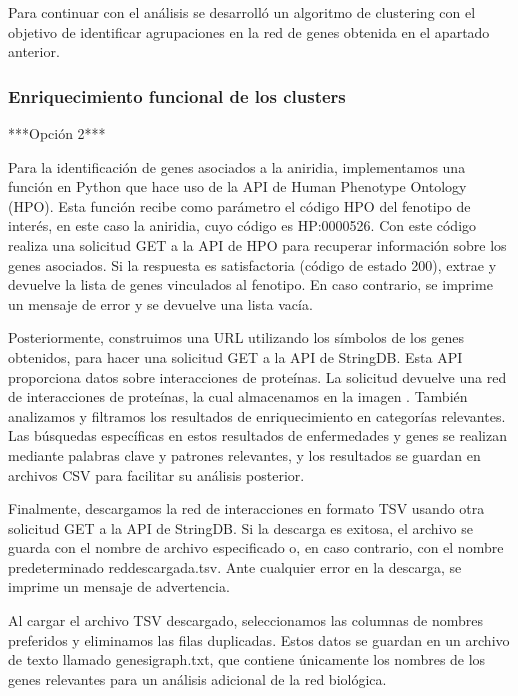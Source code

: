 Para continuar con el análisis se desarrolló un algoritmo de clustering con el objetivo de identificar agrupaciones en la red de genes obtenida en el apartado anterior.


\subsubsection{Enriquecimiento funcional de los clusters}





\newpage
\newpage


***Opción 2***

Para la identificación de genes asociados a la aniridia, implementamos una función en Python que hace uso de la API de Human Phenotype Ontology (HPO). Esta función recibe como parámetro el código HPO del fenotipo de interés, en este caso la aniridia, cuyo código es HP:0000526. Con este código realiza una solicitud GET a la API de HPO para recuperar información sobre los genes asociados. Si la respuesta es satisfactoria (código de estado 200), extrae y devuelve la lista de genes vinculados al fenotipo. En caso contrario, se imprime un mensaje de error y se devuelve una lista vacía.

Posteriormente, construimos una URL utilizando los símbolos de los genes obtenidos, para hacer una solicitud GET a la API de StringDB. Esta API proporciona datos sobre interacciones de proteínas. La solicitud devuelve una red de interacciones de proteínas, la cual almacenamos en la imagen .
También analizamos y filtramos los resultados de enriquecimiento en categorías relevantes. Las búsquedas específicas en estos resultados de enfermedades y genes se realizan mediante palabras clave y patrones relevantes, y los resultados se guardan en archivos CSV para facilitar su análisis posterior.

Finalmente, descargamos la red de interacciones en formato TSV usando otra solicitud GET a la API de StringDB. Si la descarga es exitosa, el archivo se guarda con el nombre de archivo especificado o, en caso contrario, con el nombre predeterminado reddescargada.tsv. Ante cualquier error en la descarga, se imprime un mensaje de advertencia.

Al cargar el archivo TSV descargado, seleccionamos las columnas de nombres preferidos y eliminamos las filas duplicadas. Estos datos se guardan en un archivo de texto llamado genesigraph.txt, que contiene únicamente los nombres de los genes relevantes para un análisis adicional de la red biológica.

